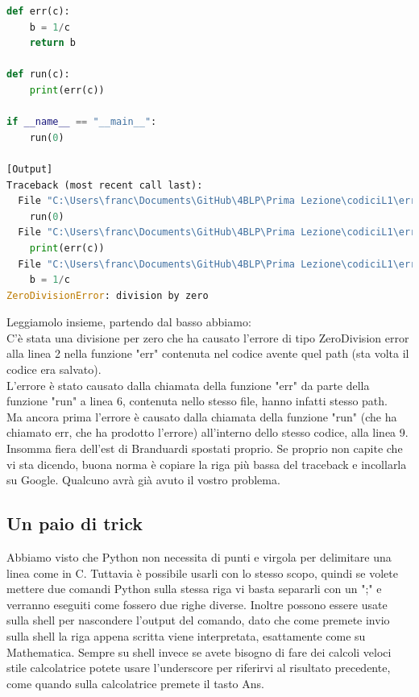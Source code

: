 \documentclass[10pt,a4paper]{article}
\begin{document}
\begin{lstlisting}[language=Python]
def err(c):
    b = 1/c
    return b

def run(c):
    print(err(c))

if __name__ == "__main__":
    run(0)

[Output]
Traceback (most recent call last):
  File "C:\Users\franc\Documents\GitHub\4BLP\Prima Lezione\codiciL1\err_trace.py", line 9, in <module>
    run(0)
  File "C:\Users\franc\Documents\GitHub\4BLP\Prima Lezione\codiciL1\err_trace.py", line 6, in run
    print(err(c))
  File "C:\Users\franc\Documents\GitHub\4BLP\Prima Lezione\codiciL1\err_trace.py", line 2, in err
    b = 1/c
ZeroDivisionError: division by zero

\end{lstlisting}
Leggiamolo insieme, partendo dal basso abbiamo:\\
C'è stata una divisione per zero che ha causato l'errore di tipo ZeroDivision error alla linea 2 nella funzione "err" contenuta nel codice avente quel path (sta volta il codice era salvato). \\
L'errore è stato causato dalla chiamata della funzione "err" da parte della funzione "run" a linea 6, contenuta nello stesso file, hanno infatti stesso path. \\
Ma ancora prima l'errore è causato dalla chiamata della funzione "run" (che ha chiamato err, che ha prodotto l'errore) all'interno dello stesso codice, alla linea 9. Insomma fiera dell'est di Branduardi spostati proprio.
Se proprio non capite che vi sta dicendo, buona norma è copiare la riga più bassa del traceback e incollarla su Google. Qualcuno avrà già avuto il vostro problema.
\subsection{Un paio di trick}
Abbiamo visto che Python non necessita di punti e virgola per delimitare una linea come in C. Tuttavia è possibile usarli con lo stesso scopo, quindi se volete mettere due comandi Python sulla stessa riga vi basta separarli con un ";" e verranno eseguiti come fossero due righe diverse. Inoltre possono essere usate sulla shell per nascondere l'output del comando, dato che come premete invio sulla shell la riga appena scritta viene interpretata, esattamente come su Mathematica. Sempre su shell invece se avete bisogno di fare dei calcoli veloci stile calcolatrice potete usare l'underscore per riferirvi al risultato precedente, come quando sulla calcolatrice premete il tasto Ans.
\newpage
\end{document}
